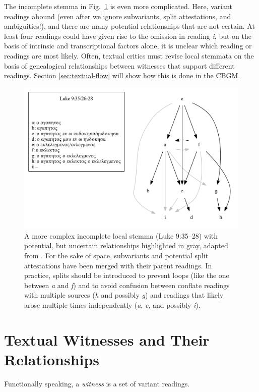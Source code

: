 \documentclass[a4paper, 12pt]{article}
\begin{document}
	\newpage
	
	The incomplete stemma in Fig.~\ref{fig:local-stemma-complex} is even more complicated. Here, variant readings abound (even after we ignore subvariants, split attestations, and ambiguities!), and there are many potential relationships that are not certain. At least four readings could have given rise to the omission in reading \emph{i}, but on the basis of intrinsic and transcriptional factors alone, it is unclear which reading or readings are most likely. Often, textual critics must revise local stemmata on the basis of genealogical relationships between witnesses that support different readings. Section \ref{sec:textual-flow} will show how this is done in the CBGM.
	
	\begin{figure}[h!]
		\centering
		\includegraphics[scale=0.6666]{../graphics/B03K9V35U26-28-local-stemma.pdf}
		\caption{A more complex incomplete local stemma (Luke 9:35–28) with potential, but uncertain relationships highlighted in gray, adapted from \cite{McCollum20}. For the sake of space, subvariants and potential split attestations have been merged with their parent readings. In practice, splits should be introduced to prevent loops (like the one between \emph{a} and \emph{f}) and to avoid confusion between conflate readings with multiple sources (\emph{h} and possibly \emph{g}) and readings that likely arose multiple times independently (\emph{a}, \emph{c}, and possibly \emph{i}).}
		\label{fig:local-stemma-complex}
	\end{figure}
	
	\newpage
	
	\section{Textual Witnesses and Their Relationships}\label{sec:witnesses}
	Functionally speaking, a \emph{witness} is a set of variant readings.
\end{document}
